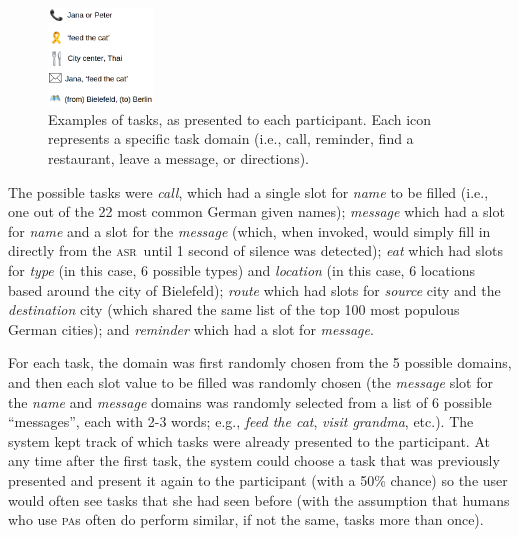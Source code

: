 \documentclass[11pt]{article}
\newcommand{\asr}[0]{\textsc{asr}}
\newcommand{\pa}[0]{\textsc{pa}}
\begin{document}
\begin{figure}
  \centering
      \includegraphics[width=0.25\textwidth]{figures/taskexample.png}	
      \caption{Examples of tasks, as presented to each participant. Each icon represents a specific task domain (i.e., call, reminder, find a restaurant, leave a message, or directions).\label{fig:taskex}}
\end{figure}


The possible tasks were \emph{call}, which had a single slot for \emph{name} to be filled (i.e., one out of the 22 most common German given names); \emph{message} which had a slot for \emph{name} and a slot for the \emph{message} (which, when invoked, would simply fill in directly from the \asr\ until 1 second of silence was detected); \emph{eat} which had slots for \emph{type} (in this case, 6 possible types) and \emph{location} (in this case, 6 locations based around the city of Bielefeld); \emph{route} which had slots for \emph{source} city and the \emph{destination} city (which shared the same list of the top 100 most populous German cities); and \emph{reminder} which had a slot for \emph{message}. 


For each task, the domain was first randomly chosen from the 5 possible domains, and then each slot value to be filled was randomly chosen (the \emph{message} slot for the \emph{name} and \emph{message} domains was randomly selected from a list of 6 possible ``messages'', each with 2-3 words; e.g., \emph{feed the cat}, \emph{visit grandma}, etc.). The system kept track of which tasks were already presented to the participant. At any time after the first task, the system could choose a task that was previously presented and present it again to the participant (with a 50\% chance) so the user would often see tasks that she had seen before (with the assumption that humans who use \pa s often do perform similar, if not the same, tasks more than once). 
\end{document}
